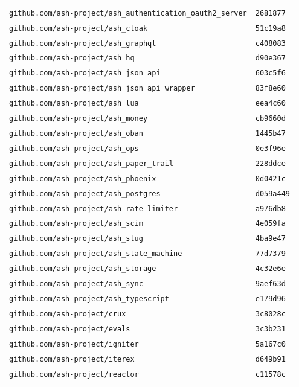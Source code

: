 \begin{longtable}{@{}p{} l@{}}
\texttt{github.com/ash-project/ash\_authentication\_oauth2\_server} & \texttt{2681877} \\
\texttt{github.com/ash-project/ash\_cloak} & \texttt{51c19a8} \\
\texttt{github.com/ash-project/ash\_graphql} & \texttt{c408083} \\
\texttt{github.com/ash-project/ash\_hq} & \texttt{d90e367} \\
\texttt{github.com/ash-project/ash\_json\_api} & \texttt{603c5f6} \\
\texttt{github.com/ash-project/ash\_json\_api\_wrapper} & \texttt{83f8e60} \\
\texttt{github.com/ash-project/ash\_lua} & \texttt{eea4c60} \\
\texttt{github.com/ash-project/ash\_money} & \texttt{cb9660d} \\
\texttt{github.com/ash-project/ash\_oban} & \texttt{1445b47} \\
\texttt{github.com/ash-project/ash\_ops} & \texttt{0e3f96e} \\
\texttt{github.com/ash-project/ash\_paper\_trail} & \texttt{228ddce} \\
\texttt{github.com/ash-project/ash\_phoenix} & \texttt{0d0421c} \\
\texttt{github.com/ash-project/ash\_postgres} & \texttt{d059a449} \\
\texttt{github.com/ash-project/ash\_rate\_limiter} & \texttt{a976db8} \\
\texttt{github.com/ash-project/ash\_scim} & \texttt{4e059fa} \\
\texttt{github.com/ash-project/ash\_slug} & \texttt{4ba9e47} \\
\texttt{github.com/ash-project/ash\_state\_machine} & \texttt{77d7379} \\
\texttt{github.com/ash-project/ash\_storage} & \texttt{4c32e6e} \\
\texttt{github.com/ash-project/ash\_sync} & \texttt{9aef63d} \\
\texttt{github.com/ash-project/ash\_typescript} & \texttt{e179d96} \\
\texttt{github.com/ash-project/crux} & \texttt{3c8028c} \\
\texttt{github.com/ash-project/evals} & \texttt{3c3b231} \\
\texttt{github.com/ash-project/igniter} & \texttt{5a167c0} \\
\texttt{github.com/ash-project/iterex} & \texttt{d649b91} \\
\texttt{github.com/ash-project/reactor} & \texttt{c11578c} \\

\end{longtable}
